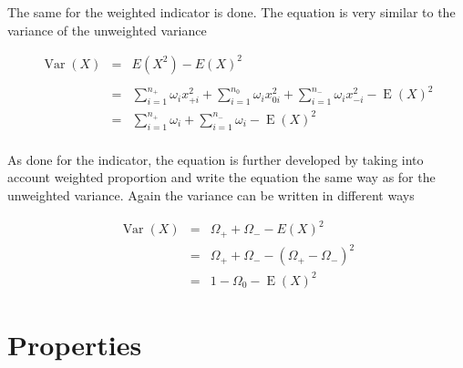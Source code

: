 \documentclass[12pt,a4paper,oneside]{book}
\DeclareMathOperator{\Var}{Var}
\DeclareMathOperator{\E}{E}
\begin{document}
The same for the weighted indicator is done. The equation is very similar to the variance of the unweighted variance

\begin{eqnarray}
\Var(X) &=&  E\left( X^2\right) - E\left( X\right)^2 \nonumber \\ \nonumber \\
    &=& \sum_{i=1}^{n_+} \omega_i x_{+i}^2 + \sum_{i=1}^{n_0} \omega_i x_{0i}^2  + \sum_{i=1}^{n_-} \omega_i x_{-i}^2 - \E(X)^2 \\
    &=& \sum_{i=1}^{n_+} \omega_i + \sum_{i=1}^{n_-} \omega_i - \E(X)^2 \nonumber \\
\end{eqnarray}

As done for the indicator, the equation is further developed by taking into account weighted proportion and write the equation the same way as for the unweighted variance. 
Again the variance can be written in different ways

\begin{eqnarray}
\Var(X) &=& \Omega_+ + \Omega_- - E ( X )^2 \\
	&=& \Omega_+ + \Omega_- - ( \Omega_+ - \Omega_- )^2 \\
    &=& 1 - \Omega_{0} - \E(X)^2 \label{eq:var3 weighted}
\end{eqnarray}


\section{Properties}
    \label{sec:properties variance}
\end{document}
